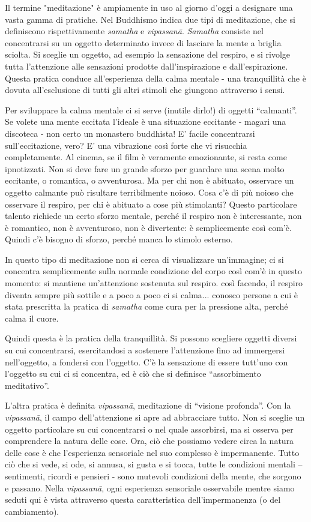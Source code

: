 
Il termine "meditazione" è ampiamente in uso al giorno d'oggi a
designare una vasta gamma di pratiche. Nel Buddhismo indica due tipi di
meditazione, che si definiscono rispettivamente \textit{samatha} e \textit{vipassanā}.
\textit{Samatha} consiste nel concentrarsi su un oggetto determinato invece di
lasciare la mente a briglia sciolta. Si sceglie un oggetto, ad esempio
la sensazione del respiro, e si rivolge tutta l'attenzione alle
sensazioni prodotte dall'inspirazione e dall'espirazione. Questa pratica
conduce all'esperienza della calma mentale - una tranquillità che è
dovuta all'esclusione di tutti gli altri stimoli che giungono attraverso
i sensi.

Per sviluppare la calma mentale ci si serve (inutile dirlo!) di oggetti
“calmanti”. Se volete una mente eccitata l'ideale è una situazione
eccitante - magari una discoteca - non certo un monastero buddhista! E'
facile concentrarsi sull'eccitazione, vero? E' una vibrazione così forte
che vi risucchia completamente. Al cinema, se il film è veramente
emozionante, si resta come ipnotizzati. Non si deve fare un grande
sforzo per guardare una scena molto eccitante, o romantica, o
avventurosa. Ma per chi non è abituato, osservare un oggetto calmante
può risultare terribilmente noioso. Cosa c'è di più noioso che osservare
il respiro, per chi è abituato a cose più stimolanti? Questo particolare
talento richiede un certo sforzo mentale, perché il respiro non è
interessante, non è romantico, non è avventuroso, non è divertente: è
semplicemente così com'è. Quindi c'è bisogno di sforzo, perché manca lo
stimolo esterno.

In questo tipo di meditazione non si cerca di visualizzare un'immagine;
ci si concentra semplicemente sulla normale condizione del corpo così
com'è in questo momento: si mantiene un'attenzione sostenuta sul
respiro. così facendo, il respiro diventa sempre più sottile e a poco a
poco ci si calma... conosco persone a cui è stata prescritta la pratica
di \textit{samatha} come cura per la pressione alta, perché calma il cuore.

Quindi questa è la pratica della tranquillità. Si possono scegliere
oggetti diversi su cui concentrarsi, esercitandosi a sostenere
l'attenzione fino ad immergersi nell'oggetto, a fondersi con l'oggetto.
C'è la sensazione di essere tutt'uno con l'oggetto su cui ci si
concentra, ed è ciò che si definisce “assorbimento meditativo”.

L'altra pratica è definita \textit{vipassanā}, meditazione di “visione profonda”.
Con la \textit{vipassanā}, il campo dell'attenzione si apre ad abbracciare tutto.
Non si sceglie un oggetto particolare su cui concentrarsi o nel quale
assorbirsi, ma si osserva per comprendere la natura delle cose. Ora, ciò
che possiamo vedere circa la natura delle cose è che l'esperienza
sensoriale nel suo complesso è impermanente. Tutto ciò che si vede, si
ode, si annusa, si gusta e si tocca, tutte le condizioni mentali –
sentimenti, ricordi e pensieri - sono mutevoli condizioni della mente,
che sorgono e passano. Nella \textit{vipassanā}, ogni esperienza sensoriale
osservabile mentre siamo seduti qui è vista attraverso questa
caratteristica dell'impermanenza (o del cambiamento).

